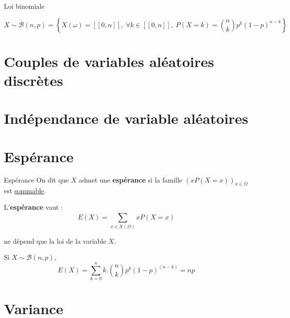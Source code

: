 \begin{Definition}[colbacktitle=red!75!black]{Loi binomiale}{}

\begin{equation}
  X \sim\mathcal{B}(n,p) = \left\{  X(\omega) = [\![0, n]\!], \; \forall k \in [\![0, n]\!], \; P(X= k) = \binom{n}{k} p ^{k} (1-p) ^{n-k} \right\}
\end{equation}
\end{Definition}



\section{Couples de variables aléatoires discrètes} %
\label{sub:Couples de variables aléatoires discrètes}

\section{Indépendance de variable aléatoires} %
\label{sub:Indépendance de variable aléatoires}

\section{Espérance} %
\label{sec:Espérance}

\begin{Definition}[colbacktitle=red!75!black]{Espérance}{}
On dit que $X$ admet une \textbf{espérance} si la famille $(xP(X=x)) _{x \in \Omega}$ est \underline{sommable}. 

L'\textbf{espérance} vaut : 
\begin{equation}
  E(X) = \sum_{x \in X(\Omega)}^{} x P(X = x)
\end{equation}

ne dépend que la loi de la variable $X$.
\end{Definition}

\begin{Example}{}{}
Si $X \sim \mathcal{B}(n,p)$, 
\begin{equation}
  E(X) = \sum_{k=0}^{n} k. \binom{n}{k} p ^{k} (1-p) ^{(n-k)} = np
\end{equation}
\end{Example}




\section{Variance} %
\label{sec:Variance}

